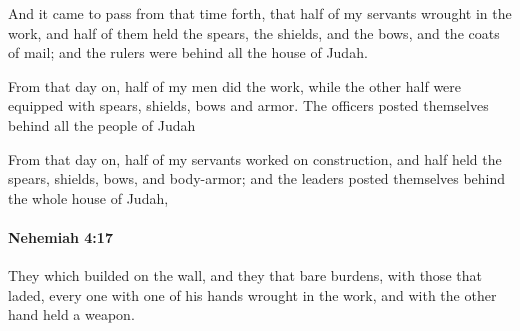			\begin{versebox}
					\item[BHS] 
					\item[LXX] 
					\item[ASV] And it came to pass from that time forth, that half of my servants wrought in the work, and half of them held the spears, the shields, and the bows, and the coats of mail; and the rulers were behind all the house of Judah.
					\item[NIV] From that day on, half of my men did the work, while the other half were equipped with spears, shields, bows and armor. The officers posted themselves behind all the people of Judah
					\item[NRSV] From that day on, half of my servants worked on construction, and half held the spears, shields, bows, and body-armor; and the leaders posted themselves behind the whole house of Judah,
			\end{versebox}

		\paragraph{Nehemiah 4:17} %
			\label{NEHEMIAH-4-17}

			They which builded on the wall, and they that bare burdens, with those that laded, every one with one of his hands wrought in the work, and with the other hand held a weapon.

